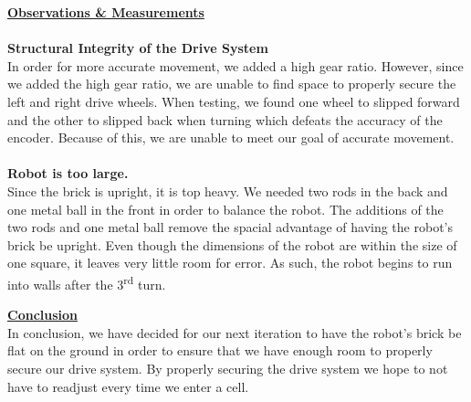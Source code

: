 \documentclass[11pt]{article}
\newcommand{\ts}{\textsuperscript}
\begin{document}
\underline{\textbf{Observations \& Measurements}}\\\\
\textbf{Structural Integrity of the Drive System}\\
In order for more accurate movement, we added a high gear ratio. However, since we added the high gear ratio, we are unable to find space to properly secure the left and right drive wheels. When testing, we found one wheel to slipped forward and the other to slipped back when turning which defeats the accuracy of the encoder. Because of this, we are unable to meet our goal of accurate movement.\\\\
\textbf{Robot is too large.}\\
Since the brick is upright, it is top heavy. We needed two rods in the back and one metal ball in the front in order to balance the robot. The additions of the two rods and one metal ball remove the spacial advantage of having the robot's brick be upright. Even though the dimensions of the robot are within the size of one square, it leaves very little room for error. As such, the robot begins to run into walls after the 3\ts{rd} turn.

\underline{\textbf{Conclusion}}\\
In conclusion, we have decided for our next iteration to have the robot's brick be flat on the ground in order to ensure that we have enough room to properly secure our drive system. By properly securing the drive system we hope to not have to readjust every time we enter a cell.

\newpage

\end{document}
